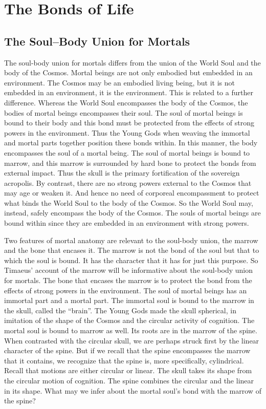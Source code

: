 
\chapter{The Bonds of Life} %
\label{cha:the_bonds_of_life}

\section{The Soul--Body Union for Mortals} %
\label{sec:the_soul_body_union_in_mortals}

The soul-body union for mortals differs from the union of the World Soul and the body of the Cosmos. Mortal beings are not only embodied but embedded in an environment. The Cosmos may be an embodied living being, but it is not embedded in an environment, it is the environment. This is related to a further difference. Whereas the World Soul encompasses the body of the Cosmos, the bodies of mortal beings encompasses their soul. The soul of mortal beings is bound to their body and this bond must be protected from the effects of strong powers in the environment. Thus the Young Gods when weaving the immortal and mortal parts together position these bonds within. In this manner, the body encompasses the soul of a mortal being. The soul of mortal beings is bound to marrow, and this marrow is surrounded by hard bone to protect the bonds from external impact. Thus the skull is the primary fortification of the sovereign acropolis. By contrast, there are no strong powers external to the Cosmos that may age or weaken it. And hence no need of corporeal encompassment to protect what binds the World Soul to the body of the Cosmos. So the World Soul may, instead, safely encompass the body of the Cosmos. The souls of mortal beings are bound within since they are embedded in an environment with strong powers.

Two features of mortal anatomy are relevant to the soul-body union, the marrow and the bone that encases it. The marrow is not the bond of the soul but that to which the soul is bound. It has the character that it has for just this purpose. So Timaeus' account of the marrow will be informative about the soul-body union for mortals. The bone that encases the marrow is to protect the bond from the effects of strong powers in the environment. The soul of mortal beings has an immortal part and a mortal part. The immortal soul is bound to the marrow in the skull, called the ``brain''. The Young Gods made the skull spherical, in imitation of the shape of the Cosmos and the circular activity of cognition. The mortal soul is bound to marrow as well. Its roots are in the marrow of the spine. When contrasted with the circular skull, we are perhaps struck first by the linear character of the spine. But if we recall that the spine encompasses the marrow that it contains, we recognize that the spine is, more specifically, cylindrical. Recall that motions are either circular or linear. The skull takes its shape from the circular motion of cognition. The spine combines the circular and the linear in its shape. What may we infer about the mortal soul's bond with the marrow of the spine?

